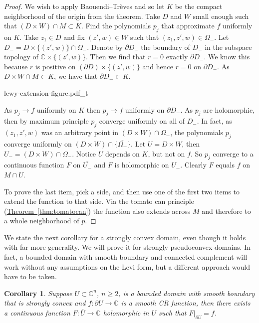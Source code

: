 \documentclass[12pt,openany]{book}
\newcommand{\C}{{\mathbb{C}}}
\theoremstyle{plain}
\newtheorem{cor}[thm]{Corollary}
\theoremstyle{remark}
\theoremstyle{definition}
\theoremstyle{exercise}
\theoremstyle{example}
\newcommand{\thmref}[1]{\hyperref[#1]{Theorem~\ref*{#1}}}
\begin{document}
\begin{proof}
We wish to apply
Baouendi--Tr{\`e}ves and so let $K$ be the compact neighborhood of the
origin from the theorem.  Take $D$ and $W$ small enough such
that $(D \times W) \cap M \subset K$.
Find the polynomials $p_j$ that approximate $f$ uniformly on $K$.
Take $z_1 \in D$ and fix $(z',w) \in W$ such that
$(z_1,z',w) \in \Omega_-$.
Let
$D_- = D \times \{ (z',w) \} \cap \Omega_-$.
Denote by $\partial D_-$ the boundary of $D_-$ in the subspace topology
of $\C \times \{ (z',w) \}$.
Then we find that $r=0$ exactly $\partial D_-$.
We know this because $r$ is positive on $(\partial D) \times \{ (z',w) \}$
and hence $r=0$ on $\partial D_-$.
As $D \times W \cap M \subset K$, we have that $\partial D_- \subset K$.

\begin{center}
{lewy-extension-figure.pdf_t}
\end{center}

As $p_j \to f$ uniformly on $K$ then $p_j \to f$ uniformly on
$\partial D_-$.  As  $p_j$ are holomorphic, then by maximum
principle $p_j$ converge uniformly on all of $D_-$.  In fact, as $(z_1,z',w)$ was
an arbitrary point in $(D \times W) \cap \Omega_-$,
the polynomials $p_j$ converge uniformly on $(D \times W) \cap \{
\overline{\Omega_-} \}$.
%
Let $U = D \times W$, then $U_- = (D \times W) \cap \Omega_-$.  Notice 
$U$ depends on $K$, but not on $f$.
So $p_j$ converge to a continuous function $F$ on $\overline{U_-}$ and $F$
is holomorphic on
$U_-$.  Clearly $F$ equals $f$ on $M \cap U$.

To prove the last item, pick a side, and then use one of the first two
items to extend the function to that side.  Via the tomato can
principle (\thmref{thm:tomatocan}) the function also extends across $M$ and
therefore to a whole neighborhood of $p$.
\end{proof}

We state the next corollary for a strongly convex domain, even though it
holds with far more generality.  We will prove it for strongly pseudoconvex
domains.  In fact, a bounded domain with smooth
boundary and connected complement
will work without any assumptions on the Levi form, but 
a different approach would have to be taken.

\begin{cor}
Suppose $U \subset \C^n$, $n \geq 2$, is a bounded domain with smooth boundary that is
strongly convex 
and $f \colon \partial U \to \C$ is a smooth CR function, then
there exists a continuous function $F \colon \overline{U} \to \C$
holomorphic in $U$
such that $F|_{\partial U} = f$.
\end{cor}
\end{document}
